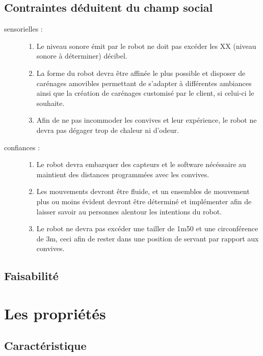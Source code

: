 \subsection{Contraintes déduitent du champ social}


\begin{description}
\item[sensorielles :]
  \begin{enumerate}
  \item Le niveau sonore émit par le robot ne doit pas excéder les XX (niveau sonore à déterminer) décibel.
  \item La forme du robot devra être affinée le plus possible et disposer de carénages amovibles permettant de s'adapter à différentes ambiances ainsi que la création de carénages customisé par le client, si celui-ci le souhaite.
  \item Afin de ne pas incommoder les convives et leur expérience, le robot ne devra pas dégager trop de chaleur ni d'odeur.
  \end{enumerate}
\item[confiances :]
  \begin{enumerate}
  \item Le robot devra embarquer des capteurs et le software nécéssaire au maintient des distances programmées avec les convives.
  \item Les mouvements devront être fluide, et un ensembles de mouvement plus ou moins évident devront être déterminé et implémenter afin de laisser savoir au personnes alentour les intentions du robot.
  \item Le robot ne devra pas excéder une tailler de 1m50 et une circonférence de 3m, ceci afin de rester dans une position de servant par rapport aux convives.
  \end{enumerate}
\end{description}


\subsection{Faisabilité}


\section{Les propriétés}
\subsection{Caractéristique}
